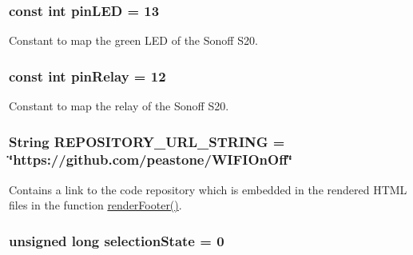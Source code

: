 \hypertarget{WIFIOnOff_8ino_aea49499f7c0ed08f20649e96024455ab}{
\subsubsection[{pin\-L\-E\-D}]{\setlength{\rightskip}{0pt plus 5cm}const int pin\-L\-E\-D = 13}}\label{WIFIOnOff_8ino_aea49499f7c0ed08f20649e96024455ab}


Constant to map the green L\-E\-D of the Sonoff S20. 

\hypertarget{WIFIOnOff_8ino_aa4021c86d826785a0f0bcac11a38d30e}{
\subsubsection[{pin\-Relay}]{\setlength{\rightskip}{0pt plus 5cm}const int pin\-Relay = 12}}\label{WIFIOnOff_8ino_aa4021c86d826785a0f0bcac11a38d30e}


Constant to map the relay of the Sonoff S20. 

\hypertarget{WIFIOnOff_8ino_ac4144c663334d0f32b58e62981300160}{
\subsubsection[{R\-E\-P\-O\-S\-I\-T\-O\-R\-Y\-\_\-\-U\-R\-L\-\_\-\-S\-T\-R\-I\-N\-G}]{\setlength{\rightskip}{0pt plus 5cm}String R\-E\-P\-O\-S\-I\-T\-O\-R\-Y\-\_\-\-U\-R\-L\-\_\-\-S\-T\-R\-I\-N\-G = \char`\"{}https\-://github.\-com/peastone/W\-I\-F\-I\-On\-Off\char`\"{}}}\label{WIFIOnOff_8ino_ac4144c663334d0f32b58e62981300160}


Contains a link to the code repository which is embedded in the rendered H\-T\-M\-L files in the function \hyperlink{WIFIOnOff_8ino_a12a8bd3c3a1288633c3eade6ee8e77cf}{render\-Footer()}. 

\hypertarget{WIFIOnOff_8ino_a969fb5df6fd687b0434058fa78c25f27}{
\subsubsection[{selection\-State}]{\setlength{\rightskip}{0pt plus 5cm}unsigned long selection\-State = 0}}\label{WIFIOnOff_8ino_a969fb5df6fd687b0434058fa78c25f27}



